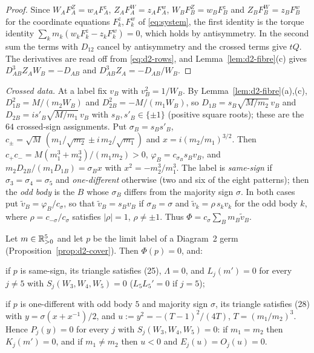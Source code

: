\begin{proof}
Since $W_AF^Z_A=w_AF^z_A$, $Z_AF^W_A=z_AF^w_A$, $W_BF^Z_B=w_BF^z_B$ and $Z_BF^W_B=z_BF^w_B$ for
the coordinate equations $F^z_k,F^w_k$ of \eqref{eq:system}, the first identity is the torque
identity $\sum_km_k(w_kF^z_k-z_kF^w_k)=0$, which holds by antisymmetry.  In the second sum the
terms with $D_{12}$ cancel by antisymmetry and the crossed terms give $tQ$.  The derivatives are
read off from \eqref{eq:d2-rows}, and Lemma~\ref{lem:d2-fibre}(c) gives
$D_{AB}^3Z_AW_B=-D_{AB}$ and $D_{AB}^3Z_A=-D_{AB}/W_B$.
\end{proof}

\emph{Crossed data.}  At a label fix $v_B$ with $v_B^2=1/W_B$.  By Lemma~\ref{lem:d2-fibre}(a),(c),
$D_{1B}^2=M/(m_2W_B)$ and $D_{2B}^2=-M/(m_1W_B)$, so $D_{1B}=s_B\sqrt{M/m_2}\,v_B$ and
$D_{2B}=is'_B\sqrt{M/m_1}\,v_B$ with $s_B,s'_B\in\{\pm1\}$ (positive square roots); these are the
$64$ crossed-sign assignments.  Put $\sigma_B=s_Bs'_B$,
$c_\pm=\sqrt M\,(m_1/\sqrt{m_2}\pm i\,m_2/\sqrt{m_1})$ and $x=i(m_2/m_1)^{3/2}$.  Then
$c_+c_-=M(m_1^3+m_2^3)/(m_1m_2)>0$, $\varphi_B=c_{\sigma_B}s_Bv_B$, and
$m_2D_{2B}/(m_1D_{1B})=\sigma_Bx$ with $x^2=-m_2^3/m_1^3$.  The label is \emph{same-sign} if
$\sigma_3=\sigma_4=\sigma_5$ and \emph{one-different} otherwise (two and six of the eight
patterns); then the \emph{odd body} is the $B$ whose $\sigma_B$ differs from the majority sign
$\sigma$.  In both cases put $\tilde v_B=\varphi_B/c_\sigma$, so that $\tilde v_B=s_Bv_B$ if
$\sigma_B=\sigma$ and $\tilde v_k=\rho\,s_kv_k$ for the odd body $k$, where
$\rho=c_{-\sigma}/c_\sigma$ satisfies $|\rho|=1$, $\rho\ne\pm1$.  Thus
$\Phi=c_\sigma\sum_Bm_B\tilde v_B$.
\begin{proposition}\label{prop:d2-first}
Let $m\in\mathbb{R}_{>0}^5$ and let $p$ be the limit label of a Diagram~2 germ
\textup{(}Proposition~\ref{prop:d2-cover}\textup{)}.  Then $\Phi(p)=0$, and:
\begin{alphalist}
  \item if $p$ is same-sign, its triangle satisfies \textup{(25)}, $\Lambda=0$, and
  $L_j(m')=0$ for every $j\ne5$ with $S_j(W_3,W_4,W_5)=0$ \textup{(}$L_5L_5'=0$ if $j=5$\textup{)};
  \item if $p$ is one-different with odd body $5$ and majority sign $\sigma$, its triangle satisfies
  \textup{(28)} with $y=\sigma(x+x^{-1})/2$, and $u:=y^2=-(T-1)^2/(4T)$, $T=(m_1/m_2)^3$.  Hence
  $P_j(y)=0$ for every $j$ with $S_j(W_3,W_4,W_5)=0$: if $m_1=m_2$ then $K_j(m')=0$, and if
  $m_1\ne m_2$ then $u<0$ and $E_j(u)=O_j(u)=0$.
\end{alphalist}
\end{proposition}

